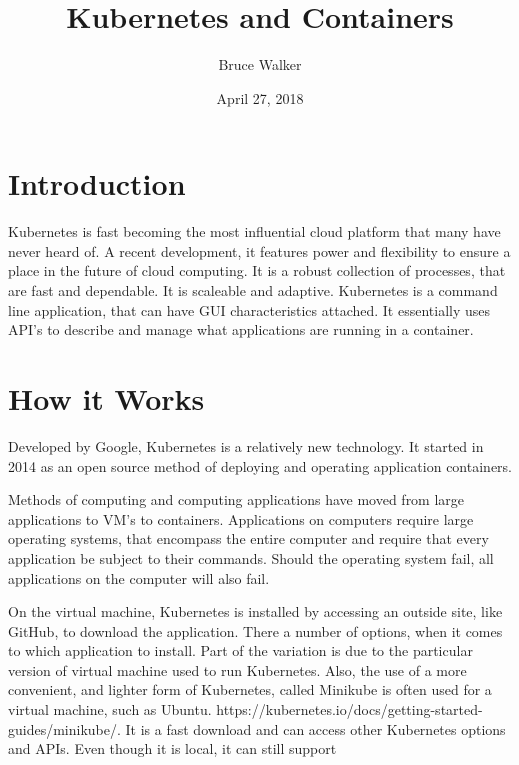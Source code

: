 
\title{Kubernetes and Containers}
\author{Bruce Walker}

 
\date{ April 27, 2018}

\maketitle 

\section{Introduction}

Kubernetes is fast becoming the most influential cloud platform that
many have never heard of.  A recent development, it features power and
flexibility to ensure a place in the future of cloud computing.  It is
a robust collection of processes, that are fast and dependable.  It is
scaleable and adaptive. Kubernetes is a command line application, that
can have GUI characteristics attached.  It essentially uses API's to
describe and manage what applications are running in a container.
\cite {hid-sp18-525-concept}

\section{How it Works}

Developed by Google, Kubernetes is a relatively new technology.  It
started in 2014 as an open source method of deploying and operating
application containers.  

Methods of computing and computing applications have moved from large
applications to VM's to containers.  Applications on computers require
large operating systems, that encompass the entire computer and
require that every application be subject to their commands.  Should
the operating system fail, all applications on the computer will also
fail.   

On the virtual machine, Kubernetes is installed by accessing an
outside site, like GitHub, to download the application.  There a
number of options, when it comes to which application to install.
Part of the variation is due to the particular version of virtual
machine used to run Kubernetes.  Also, the use of a more convenient,
and lighter form of Kubernetes, called Minikube is often used for a
virtual machine, such as
Ubuntu. https://kubernetes.io/docs/getting-started-guides/minikube/.
It is a fast download and can access other Kubernetes options and
APIs.  Even though it is local, it can still
support~\cite{hid-sp18-525-concept}

